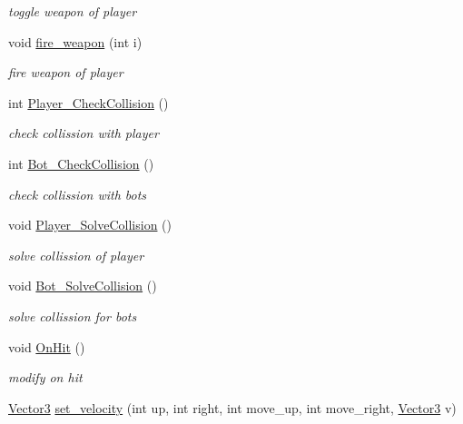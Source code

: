 \begin{DoxyCompactItemize}
\begin{DoxyCompactList}\small\item\em toggle weapon of player \end{DoxyCompactList}\item 
void \hyperlink{classplayer_a55b3c3becfc0c42a1f08a35f068db15d}{fire\+\_\+weapon} (int i)
\begin{DoxyCompactList}\small\item\em fire weapon of player \end{DoxyCompactList}\item 
int \hyperlink{classplayer_a3be60b355c9a56a7ea97dbc2d4add1e7}{Player\+\_\+\+Check\+Collision} ()
\begin{DoxyCompactList}\small\item\em check collission with player \end{DoxyCompactList}\item 
int \hyperlink{classplayer_a1ac4638964d558b38916b5e8e714ae12}{Bot\+\_\+\+Check\+Collision} ()
\begin{DoxyCompactList}\small\item\em check collission with bots \end{DoxyCompactList}\item 
\hypertarget{classplayer_a374403c65f90dab26653be9093b7b19d}{void \hyperlink{classplayer_a374403c65f90dab26653be9093b7b19d}{Player\+\_\+\+Solve\+Collision} ()}\label{classplayer_a374403c65f90dab26653be9093b7b19d}

\begin{DoxyCompactList}\small\item\em solve collission of player \end{DoxyCompactList}\item 
\hypertarget{classplayer_a26efa165f6eb7cc12b8c7c2e0fbbcc22}{void \hyperlink{classplayer_a26efa165f6eb7cc12b8c7c2e0fbbcc22}{Bot\+\_\+\+Solve\+Collision} ()}\label{classplayer_a26efa165f6eb7cc12b8c7c2e0fbbcc22}

\begin{DoxyCompactList}\small\item\em solve collission for bots \end{DoxyCompactList}\item 
\hypertarget{classplayer_a2d0bbbee2088ab84bcea87b86a2fa154}{void \hyperlink{classplayer_a2d0bbbee2088ab84bcea87b86a2fa154}{On\+Hit} ()}\label{classplayer_a2d0bbbee2088ab84bcea87b86a2fa154}

\begin{DoxyCompactList}\small\item\em modify on hit \end{DoxyCompactList}\item 
\hypertarget{classplayer_a65d7a50745e4c8ce7e57b406183c1ba8}{\hyperlink{class_vector3}{Vector3} \hyperlink{classplayer_a65d7a50745e4c8ce7e57b406183c1ba8}{set\+\_\+velocity} (int up, int right, int move\+\_\+up, int move\+\_\+right, \hyperlink{class_vector3}{Vector3} v)}\label{classplayer_a65d7a50745e4c8ce7e57b406183c1ba8}


\end{DoxyCompactItemize}
